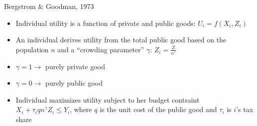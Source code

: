 \documentclass[aspectratio=169]{beamer}
\begin{document}
\begin{frame}{Bergstrom \& Goodman, 1973}

\begin{itemize}
\item Individual utility is a function of private and public goods: $U_i = f(X_i, Z_i)$ 
\pause
\item An individual derives utility from the total public good based on the population $n$ and a ``crowding parameter'' $\gamma$: $Z_i = \frac{Z}{n^\gamma}$
\pause
\item $\gamma = 1 \rightarrow$ purely private good
\pause
\item $\gamma = 0 \rightarrow$ purely public good
\pause
\item Individual maximizes utility subject to her budget contraint $X_i + \tau_i q n^\gamma Z_i \leq Y_i$, where $q$ is the unit cost of the public good and $\tau_i$ is $i$'s tax share

\end{itemize}


\end{frame}
\end{document}
